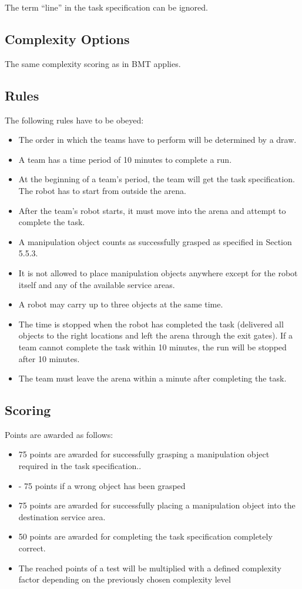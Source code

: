 The term “line” in the task specification can be ignored.


\subsection{Complexity Options}
The same complexity scoring as in BMT applies.

\subsection{Rules}
The following rules have to be obeyed:

\begin{itemize}
\item The order in which the teams have to perform will be determined by a draw.
\item A team has a time period of 10 minutes to complete a run.
\item At the beginning of a team’s period, the team will get the task specification. The robot has to start from outside the arena.
\item After the team’s robot starts, it must move into the arena and attempt to complete the task. 
\item A manipulation object counts as successfully grasped as specified in Section 5.5.3. 
\item It is not allowed to place manipulation objects anywhere except for the robot itself and any of the available service areas.
\item A robot may carry up to three objects at the same time.
\item The time is stopped when the robot has completed the task (delivered all objects to the right locations and left the arena through the exit gates). If a team cannot complete the task within 10 minutes, the run will be stopped after 10 minutes. 
\item The team must leave the arena within a minute after completing the task.
\end{itemize}



\subsection{Scoring}
Points are awarded as follows:

\begin{itemize}
\item 75 points are awarded for successfully grasping a manipulation object required in the task specification.. 
\item - 75 points if a wrong object has been grasped
\item 75 points are awarded for successfully placing a manipulation object into the destination service area.
\item 50 points are awarded for completing the task specification completely correct. 
\item The reached points of a test will be multiplied with a defined complexity factor depending on the previously chosen complexity level
\end{itemize}

